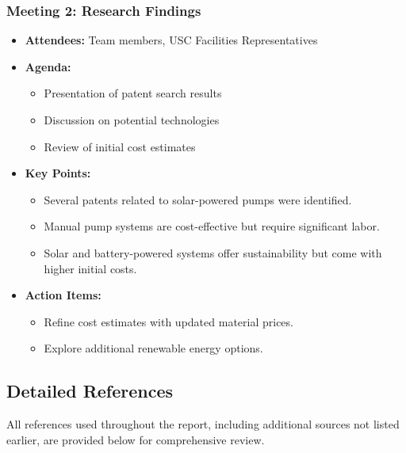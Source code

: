 \documentclass[12pt]{article}
\begin{document}
    \subsubsection{Meeting 2: Research Findings}
    \begin{itemize}
        \item \textbf{Attendees:} Team members, USC Facilities Representatives
        \item \textbf{Agenda:}
        \begin{itemize}
            \item Presentation of patent search results
            \item Discussion on potential technologies
            \item Review of initial cost estimates
        \end{itemize}
        \item \textbf{Key Points:}
        \begin{itemize}
            \item Several patents related to solar-powered pumps were identified.
            \item Manual pump systems are cost-effective but require significant labor.
            \item Solar and battery-powered systems offer sustainability but come with higher initial costs.
        \end{itemize}
        \item \textbf{Action Items:}
        \begin{itemize}
            \item Refine cost estimates with updated material prices.
            \item Explore additional renewable energy options.
        \end{itemize}
    \end{itemize}
    
    
    \subsection{Detailed References}
    All references used throughout the report, including additional sources not listed earlier, are provided below for comprehensive review.
    
\end{document}
